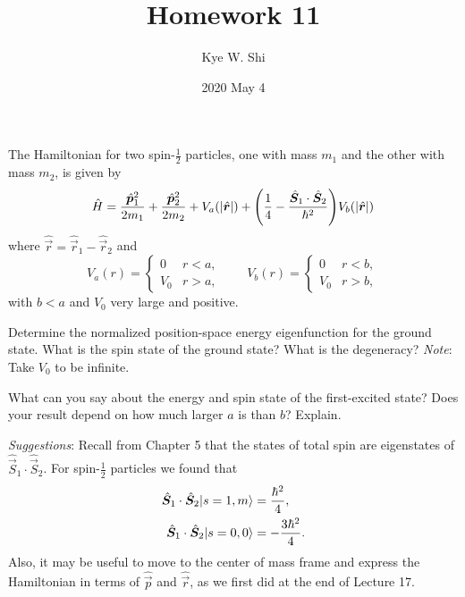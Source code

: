 \documentclass {../phys116}
\title {Homework 11}
\author {Kye W. Shi}
\date {2020 May 4}
\begin{document}
\begin {exercise} 
  The Hamiltonian for two spin-\(\frac 1 2\) particles, one with mass
  \(m_1\) and the other with mass \(m_2\), is given by
  \[
    \hat H
    = \frac {\hat {\vec p}_1^2} {2 m_1}
    + \frac {\hat {\vec p}_2^2} {2 m_2}
    + V_a (\abs {\hat {\vec r}})
    + \prn* {
      \frac 1 4
      - \frac {\hat {\vec S}_1 \cdot \hat {\vec S}_2} {\hbar^2}
    }
    V_b (\abs {\hat {\vec r}})
  \]
  where \(\hat {\vec r} = \hat {\vec r}_1 - \hat {\vec r}_2\) and
  \[
    V_a(r) =
    \begin {cases}
      0 & r < a, \\
      V_0 & r > a,
    \end {cases}
    \qquad
    V_b(r) =
    \begin {cases}
      0 & r < b, \\
      V_0 & r > b,
    \end {cases}
  \]
  with \(b < a\) and \(V_0\) very large and positive.
  \begin {problems}
  \item Determine the normalized position-space energy eigenfunction
    for the ground state.  What is the spin state of the ground state?
    What is the degeneracy?  \textit {Note}: Take \(V_0\) to be
    infinite.
  \item What can you say about the energy and spin state of the
    first-excited state?  Does your result depend on how much larger
    \(a\) is than \(b\)?  Explain.
  \end {problems}

  \textit {Suggestions}: Recall from Chapter 5 that the states of
  total spin are eigenstates of
  \(\hat {\vec S}_1 \cdot \hat {\vec S}_2\).  For spin-\(\frac 1 2\)
  particles we found that
  \begin {align*}
    \hat {\vec S}_1 \cdot \hat {\vec S}_2 \ket {s = 1, m} &= \frac {\hbar^2} 4, \\
    \hat {\vec S}_1 \cdot \hat {\vec S}_2 \ket {s = 0, 0} &= -\frac {3 \hbar^2} 4.
  \end {align*}
  Also, it may be useful to move to the center of mass frame and
  express the Hamiltonian in terms of \(\hat {\vec p}\) and
  \(\hat {\vec r}\), as we first did at the end of Lecture 17.
\end {exercise}

\begin {solution}
  \begin {problems}
  \item
  \end {problems}
\end {solution}
\end{document}
